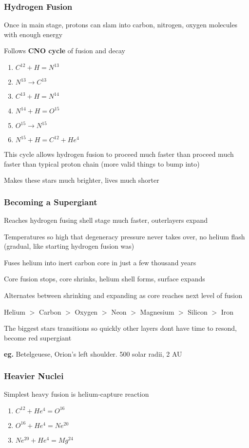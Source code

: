 \subsubsection{Hydrogen Fusion}
Once in main stage, protons can slam into carbon, nitrogen, oxygen molecules with enough energy

Follows {\bf CNO cycle} of fusion and decay
\begin{enumerate}
\item $C^{12} + H = N^{13}$
\item $N^{13} \to C^{13}$
\item $C^{13} + H = N^{14}$
\item $N^{14} + H = O^{15}$
\item $O^{15} \to N^{15}$
\item $N^{15} + H = C^{12} + He^{4}$
\end{enumerate}

This cycle allows hydrogen fusion to proceed much faster than proceed much faster than typical proton chain (more valid things to bump into)

Makes these stars much brighter, lives much shorter

\subsubsection{Becoming a Supergiant}
Reaches hydrogen fusing shell stage much faster, outerlayers expand

Temperatures so high that degeneracy pressure never takes over, no helium flash (gradual, like starting hydrogen fusion was)

Fuses helium into inert carbon core in just a few thousand years

Core fusion stops, core shrinks, helium shell forms, surface expands

Alternates between shrinking and expanding as core reaches next level of fusion

Helium $>$ Carbon $>$ Oxygen $>$ Neon $>$ Magnesium $>$ Silicon $>$ Iron

The biggest stars transitions so quickly other layers dont have time to resond, become red supergiant

{\bf eg.} Betelgeuese, Orion's left shoulder. 500 solar radii, 2 AU

\subsubsection{Heavier Nuclei}
Simplest heavy fusion is helium-capture reaction
\begin{enumerate}
\item $C^{12}+ He^{4} = O^{16}$
\item $O^{16}+ He^{4} = Ne^{20}$
\item $Ne^{20}+ He^{4} = Mg^{24}$
\end{enumerate}

